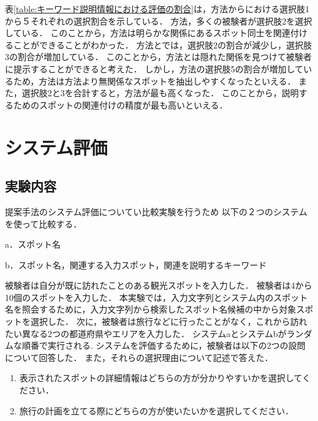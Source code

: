 \documentclass{deimj}
\begin{document}
表\ref{table:キーワード説明情報における評価の割合}は，方法からにおける選択肢1から５それぞれの選択割合を示している．
方法，多くの被験者が選択肢2を選択している．
このことから，方法は明らかな関係にあるスポット同士を関連付けることができることがわかった．
方法とでは，選択肢2の割合が減少し，選択肢3の割合が増加している．
このことから，方法とは隠れた関係を見つけて被験者に提示することができると考えた．
しかし，方法の選択肢5の割合が増加しているため，方法は方法より無関係なスポットを抽出しやすくなったといえる．
また，選択肢2と3を合計すると，方法が最も高くなった．
このことから，説明するためのスポットの関連付けの精度が最も高いといえる．


\section{システム評価}
\label{sec:システム評価}
\subsection{実験内容}
提案手法のシステム評価についてい比較実験を行うため
以下の２つのシステムを使って比較する．
\begin{description}
  \item a．スポット名
  \item b．スポット名，関連する入力スポット，関連を説明するキーワード
\end{description}

被験者は自分が既に訪れたことのある観光スポットを入力した．
被験者は4から10個のスポットを入力した．
本実験では，入力文字列とシステム内のスポット名を照会するために，入力文字列から検索したスポット名候補の中から対象スポットを選択した．
次に，被験者は旅行などに行ったことがなく，これから訪れたい異なる2つの都道府県やエリアを入力した．
システムaとシステムbがランダムな順番で実行される.
システムを評価するために，被験者は以下の2つの設問について回答した．
また，それらの選択理由について記述で答えた．
\begin{enumerate}
  \item 表示されたスポットの詳細情報はどちらの方が分かりやすいかを選択してください．
  \item 旅行の計画を立てる際にどちらの方が使いたいかを選択してください．
\end{enumerate}
\end{document}
